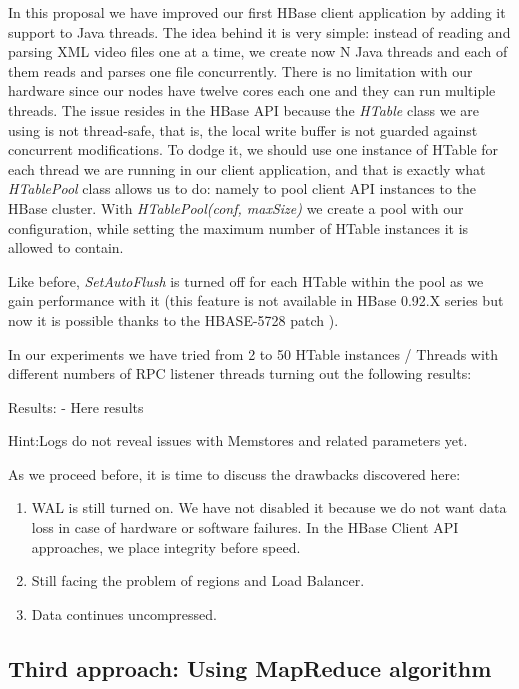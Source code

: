 In this proposal we have improved our first HBase client application by adding it support to Java threads. The idea behind it is very simple: instead of reading and parsing XML video files one at a time, we create now N Java threads and each of them reads and parses one file concurrently. There is no limitation with our hardware since our nodes have twelve cores each one and they can run multiple threads. The issue resides in the HBase API because the \textit{HTable} class we are using is not thread-safe, that is, the local write buffer is not guarded against concurrent modifications. To dodge it, we should use one instance of HTable for each thread we are running in our client application, and that is exactly what \textit{HTablePool} class allows us to do: namely to pool client API instances to the HBase cluster. With \textit{HTablePool(conf, maxSize)} we create a pool with our configuration, while setting the maximum number of HTable instances it is allowed to contain. 
\par
Like before, \textit{SetAutoFlush} is turned off for each HTable within the pool as we gain performance with it (this feature is not available in HBase 0.92.X series but now it is possible thanks to the HBASE-5728 patch \cite{HBase5728}). 
\par
 In our experiments we have tried from 2 to 50 HTable instances / Threads with different numbers of RPC listener threads turning out the following results:
\bigskip
\centerline{}
\bigskip
\centerline{Results: - Here results}
\par

Hint:Logs do not reveal issues with Memstores and related parameters yet.
\bigskip

As we proceed before, it is time to discuss the drawbacks discovered here:
\begin{enumerate}
\item WAL is still turned on. We have not disabled it because we do not want data loss in case of hardware or software failures. In the HBase Client API approaches, we place integrity before speed.

\item Still facing the problem of regions and Load Balancer.

\item Data continues uncompressed.
\end{enumerate}


\subsection{Third approach: Using MapReduce algorithm}



